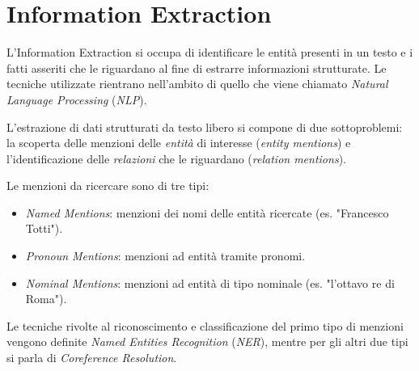 













\section{Information Extraction}
\label{sec:literature_review:information_extraction}

L'Information Extraction si occupa di identificare le entità presenti in un testo e i fatti asseriti che le riguardano al fine di estrarre informazioni strutturate. Le tecniche utilizzate rientrano nell'ambito di quello che viene chiamato \textit{Natural Language Processing} (\textit{NLP}).

L'estrazione di dati strutturati da testo libero si compone di due sottoproblemi: la scoperta delle menzioni delle \textit{entità} di interesse (\textit{entity mentions}) e l'identificazione delle \textit{relazioni} che le riguardano (\textit{relation mentions})\cite{Grishman2012InformationEC}.

Le menzioni da ricercare sono di tre tipi:
\begin{itemize}
\item \textit{Named Mentions}: menzioni dei nomi delle entità ricercate (es. "Francesco Totti"). 
\item \textit{Pronoun Mentions}: menzioni ad entità tramite pronomi.
\item\textit{Nominal Mentions}: menzioni ad entità di tipo nominale (es. "l'ottavo re di Roma").
\end{itemize}
Le tecniche rivolte al riconoscimento e classificazione del primo tipo di menzioni vengono definite \textit{Named Entities Recognition} (\textit{NER}), mentre per gli altri due tipi si parla di \textit{Coreference Resolution}.

